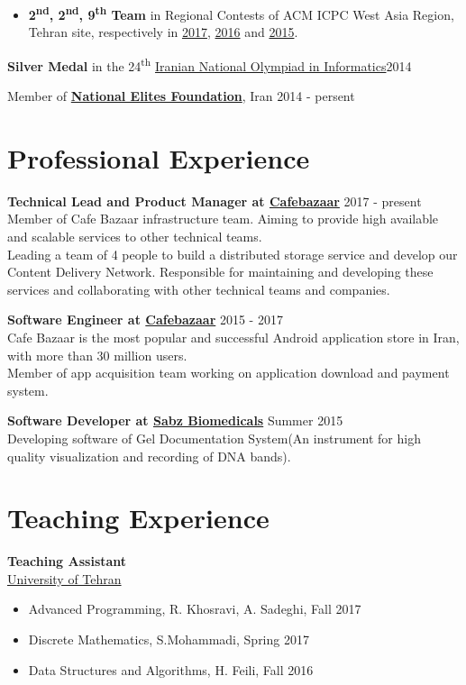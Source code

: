 \documentclass[margin]{res}
\begin{document}
\begin{resume}
\begin{itemize}
	\item {\bf 2\textsuperscript{nd}, 2\textsuperscript{nd}, 9\textsuperscript{th} Team} in Regional Contests of ACM ICPC West Asia Region,
	Tehran site, respectively in 
	\href{http://icpc.sharif.edu/acmicpc17/scoreboard/}{2017}, 
	\href{http://icpc.sharif.edu/acmicpc16/scoreboard/}{2016} and 
	\href{http://icpc.sharif.edu/acmicpc15/scoreboard/}{2015}.

    \end{itemize}

    {\bf Silver Medal} in the 24\textsuperscript{th} \href{http://inoi.ir/}{Iranian National Olympiad in Informatics}\hfill 2014

    Member of \href{https://www.bmn.ir/}{{\bf National Elites Foundation}}, Iran \hfill 2014 - persent

\section{Professional Experience}
    {\bf Technical Lead and Product Manager at \href{https://cafebazaar.ir/}{Cafebazaar}} \hfill 2017 - present
    \\ Member of Cafe Bazaar infrastructure team. Aiming to provide high available and scalable services to other technical teams. 
    \\Leading a team of 4 people to build a distributed storage service and develop our Content Delivery Network. Responsible for maintaining and developing these services and collaborating with other technical teams and companies.
    
    {\bf Software Engineer at \href{https://cafebazaar.ir/}{Cafebazaar}} \hfill 2015 - 2017
    \\ Cafe Bazaar is the most popular and successful Android application store in Iran, with more than 30 million users.
    \\ Member of app acquisition team working on application download and payment system.
    
    {\bf Software Developer at \href{http://www.sabzgroup.com/}{Sabz Biomedicals}} \hfill Summer 2015
    \\Developing software of Gel Documentation System(An instrument for  high quality visualization and recording of DNA bands).

\section{Teaching Experience}
	{\bf Teaching Assistant}
	\\\href{http://ut.ac.ir/en}{University of Tehran}
	\begin{itemize}
		\item Advanced Programming, R. Khosravi, A. Sadeghi, Fall 2017
		\item Discrete Mathematics, S.Mohammadi, Spring 2017
		\item Data Structures and Algorithms, H. Feili, Fall 2016
	\end{itemize}


\end{resume}
\end{document}
